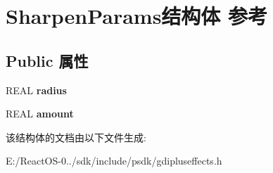\hypertarget{struct_sharpen_params}{}\section{Sharpen\+Params结构体 参考}
\label{struct_sharpen_params}
\subsection*{Public 属性}
\begin{DoxyCompactItemize}
\item 
\mbox{\label{struct_sharpen_params_a983969c30339b45d827b8fb7c016b594}} 
R\+E\+AL {\bfseries radius}
\item 
\mbox{\label{struct_sharpen_params_aaf656720201453e97c586c8399c80d68}} 
R\+E\+AL {\bfseries amount}
\end{DoxyCompactItemize}


该结构体的文档由以下文件生成\+:\begin{DoxyCompactItemize}
\item 
E\+:/\+React\+O\+S-\/0../sdk/include/psdk/gdipluseffects.\+h\end{DoxyCompactItemize}
